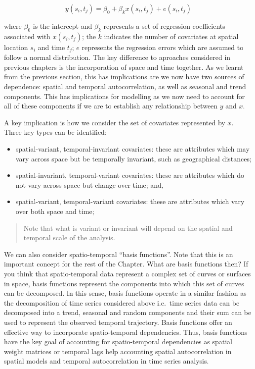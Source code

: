 \documentclass[
]{book}
\begin{document}
\[y(s_{i}, t_{j}) = \beta_{0} + \beta_{k}x(s_{i}, t_{j}) + e(s_{i}, t_{j})\]

where \(\beta_{0}\) is the intercept and \(\beta_{k}\) represents a set of regression coefficients associated with \(x(s_{i}, t_{j})\); the \(k\) indicates the number of covariates at spatial location \(s_{i}\) and time \(t_{j}\); \(e\) represents the regression errors which are assumed to follow a normal distribution. The key difference to aproaches considered in previous chapters is the incorporation of space and time together. As we learnt from the previous section, this has implications are we now have two sources of dependence: spatial and temporal autocorrelation, as well as seasonal and trend components. This has implications for modelling as we now need to account for all of these components if we are to establish any relationship between \(y\) and \(x\).

A key implication is how we consider the set of covariates represented by \(x\). Three key types can be identified:

\begin{itemize}
\item
  spatial-variant, temporal-invariant covariates: these are attributes which may vary across space but be temporally invariant, such as geographical distances;
\item
  spatial-invariant, temporal-variant covariates: these are attributes which do not vary across space but change over time; and,
\item
  spatial-variant, temporal-variant covariates: these are attributes which vary over both space and time;
\end{itemize}

\begin{quote}
Note that what is variant or invariant will depend on the spatial and temporal scale of the analysis.
\end{quote}

We can also consider spatio-temporal ``basis functions''. Note that this is an important concept for the rest of the Chapter. What are basis functions then? If you think that spatio-temporal data represent a complex set of curves or surfaces in space, basis functions represent the components into which this set of curves can be decomposed. In this sense, basis functions operate in a similar fashion as the decomposition of time series considered above i.e.~time series data can be decomposed into a trend, seasonal and random components and their sum can be used to represent the observed temporal trajectory. Basis functions offer an effective way to incorporate spatio-temporal dependencies. Thus, basis functions have the key goal of accounting for spatio-temporal dependencies as spatial weight matrices or temporal lags help accounting spatial autocorrelation in spatial models and temporal autocorrelation in time series analysis.
\end{document}
